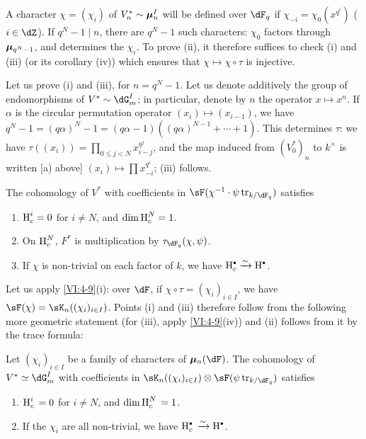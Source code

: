 A character $\chi=(\chi_i)$ of $V_n^\ast\sim {\bm\mu}_n^I$ will be defined over
$\dF_q$ if $\chi_{-i} =\chi_0(x^{q^i})$ ($i\in \dZ$). If $q^N-1\mid n$, there are
$q^N-1$ such characters: $\chi_0$ factors through ${\bm\mu}_{q^N-1}$, and
determines the $\chi_i$. To prove (ii), it therefore suffices to check (i)
and (iii) (or its corollary (iv)) which ensures that $\chi\mapsto \chi\circ \tau$
is injective.

Let us prove (i) and (iii), for $n=q^N-1$. Let us denote additively the group of
endomorphisms of $V^\ast\sim \dG_m^I$; in particular, denote by $n$
the operator $x\mapsto x^n$. If $\alpha$ is the circular permutation
operator $(x_i)\mapsto (x_{i-1})$, we have
$q^N-1=(q\alpha)^N-1 = (q\alpha-1)((q\alpha)^{N-1}+\cdots + 1)$. This
determines $\tau$: we have $\tau((x_i)) = \prod_{0\leqslant j<N} x_{i-j}^{q^j}$,
and the map induced from $(V_0^\ast)_n$ to $k^\times$ is written [a)
above] $(x_i)\mapsto \prod x_{-i}^{q^i}$; (iii) follows. 





\begin{proposition_}\label{VI:4-10}
The cohomology of $V^\ast$ with coefficients in
$\sF(\chi^{-1}\cdot \psi\tr_{k/\dF_q})$ satisfies
\begin{enumerate}[\indent (i)]
  \item $\operatorname{H}_c^i = 0$ for $i\ne N$, and $\dim \operatorname{H}_c^N=1$.
  \item On $\operatorname{H}_c^N$, $F^\ast$ is multiplication by
    $\tau_{\dF_q}(\chi,\psi)$.
  \item If $\chi$ is non-trivial on each factor of $k$, we have
    $\h_c^\bullet \iso \h^\bullet$.
\end{enumerate}
\end{proposition_}

Let us apply \ref{VI:4-9}(i): over $\dF$, if $\chi\circ \tau=(\chi_i)_{i\in I}$,
we have $\sF(\chi) = \sK_n((\chi_i)_{i\in I})$. Points (i) and (iii)
therefore follow from the following more geometric statement (for (iii),
apply \ref{VI:4-9}(iv)) and (ii) follows from it by the trace formula: 





\begin{proposition_}\label{VI:4-11}
Let $(\chi_i)_{i\in I}$ be a family of characters of $\dmu_n(\dF)$. The
cohomology of $V^\ast\simeq \dG_m^I$ with coefficients in
$\sK_n((\chi_i)_{i\in I})\otimes \sF(\psi\tr_{k/\dF_q})$ satisfies
\begin{enumerate}[\indent (i)]
  \item $\operatorname{H}_c^i{}=0$ for $i\ne N$, and $\dim \operatorname{H}_c^N{} = 1$.
  \item If the $\chi_i$ are all non-trivial, we have
    $\h_c^\bullet{}\iso \h^\bullet$.
\end{enumerate}
\end{proposition_}

